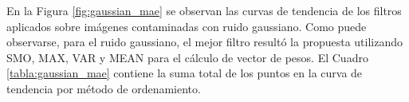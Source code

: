 %		
%
%
\normalsize

En la Figura \ref{fig:gaussian_mae} se observan las curvas de tendencia de los filtros aplicados sobre imágenes contaminadas con ruido gaussiano. Como puede observarse, para el ruido gaussiano, el mejor filtro resultó la propuesta utilizando SMO, MAX, VAR y MEAN para el cálculo de vector de pesos. El Cuadro \ref{tabla:gaussian_mae} contiene  la suma total de los puntos en la curva de tendencia por método de ordenamiento.

